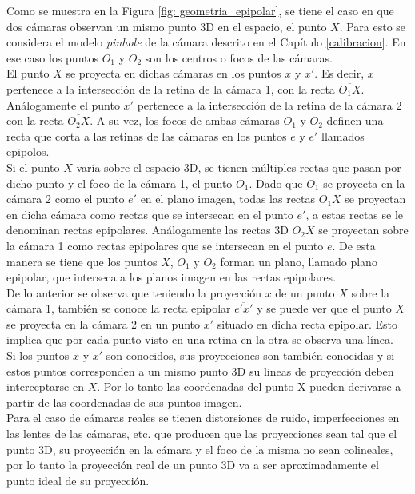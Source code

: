  Como se muestra en la Figura \ref{fig: geometria_epipolar}, se tiene el caso en que dos cámaras observan un mismo punto 3D en el espacio, el punto $X$. Para esto se considera el modelo \textit{pinhole} de la cámara  descrito en el Capítulo \ref{calibracion}. En ese caso los puntos $O_1$ y $O_2$ son los centros o focos de las cámaras.\\
 
  El punto $X$ se proyecta en dichas cámaras en los puntos $x$ y $x'$. Es decir, $x$ pertenece a la intersección de la retina de la cámara 1, con la recta $\overline{O_1X}$. Análogamente el punto $x'$ pertenece a la intersección de la retina de la cámara 2 con la recta $\overline{O_2X}$. A su vez, los focos de ambas cámaras $O_1$ y $O_2$ definen una recta que corta a las retinas de las cámaras en los puntos $e$ y $e'$ llamados epipolos.\\
  
  Si el punto $X$ varía sobre el espacio 3D, se tienen múltiples rectas que pasan por dicho punto y el foco de la cámara 1, el punto $O_1$. Dado que $O_1$ se proyecta en la cámara 2 como el punto $e'$ en el plano imagen, todas las rectas  $\overline{O_1X}$ se proyectan en dicha cámara como rectas que se intersecan en el punto $e'$, a estas rectas se le denominan rectas epipolares. Análogamente las rectas 3D $\overline{O_2X}$ se proyectan sobre la cámara 1 como rectas epipolares que se intersecan en el punto $e$. De esta manera se tiene que los puntos $X$, $O_1$ y $O_2$ forman un plano, llamado plano epipolar,  que interseca a los planos imagen en las rectas epipolares.\\
  
De lo anterior se observa que teniendo la proyección $x$ de un punto $X$ sobre la cámara 1, también se conoce la recta epipolar $\overline{e'x'}$ y se puede ver que el punto $X$ se proyecta en la cámara 2 en un punto $x'$ situado en dicha recta epipolar. Esto implica que por cada punto visto en una retina en la otra se observa una línea.\\
 
Si los puntos $x$ y $x'$ son conocidos, sus proyecciones son también conocidas y si estos puntos corresponden a un mismo punto 3D su lineas de proyección deben interceptarse en $X$. Por lo tanto las coordenadas del punto X pueden derivarse a partir de las coordenadas de sus puntos imagen.\\
 
Para el caso de cámaras reales se tienen distorsiones de ruido, imperfecciones en las lentes de las cámaras, etc. que producen que las proyecciones sean tal que el punto 3D, su proyección en la cámara y el foco de la misma no sean colineales, por lo tanto la proyección real de un punto 3D va a ser aproximadamente el punto ideal de su proyección. \\

